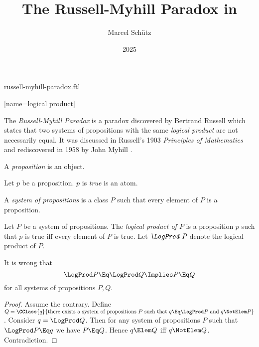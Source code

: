 \documentclass{stex}
\title{The Russell-Myhill Paradox in \Naproche}
\author{Marcel Schütz}
\date{2025}
\begin{document}
\begin{smodule}{russell-myhill-paradox.ftl}


[name=logical product]{\mathop{\sqcap}}

\maketitle

\noindent The \emph{Russell-Myhill Paradox} is a paradox discovered by 
Bertrand Russell which states that two systems of propositions with the same 
\emph{logical product} are not necessarily equal.
It was discussed in Russell's 1903 \emph{Principles of Mathematics}
\cite[Appendix B]{Russell1903} and rediscovered in 1958 by John Myhill
\cite{Myhill1958}.

\begin{forthel}
  \begin{signature*}[for=proposition]
    A \emph{proposition} is an object.
  \end{signature*}

  \begin{signature*}[for=true]
    Let $p$ be a proposition.
    $p$ is \emph{true} is an atom.
  \end{signature*}

  \begin{definition*}[for=system of propositions]
    A \emph{system of propositions} is a class $P$ such that every element of $P$ is a proposition.
  \end{definition*}

  \begin{signature*}[for=logical product]
    Let $P$ be a system of propositions.
    The \emph{logical product of $P$} is a proposition $p$ such that $p$ is true iff every element of $P$ is true.
    Let $\emph{\LogProd P}$ denote the logical product of $P$.
  \end{signature*}
  
  \begin{theorem*}[title=Russell-Myhill Paradox,name=Russell-Myhill Paradox]
    It is wrong that
    \[ \LogProd P \Eq \LogProd Q \Implies P \Eq Q \]
    for all systems of propositions $P, Q$.
  \end{theorem*}
  \begin{proof}
    Assume the contrary.
    Define $Q = \CClass{q}{\text{there exists a system of propositions } P \text{ such that } q \Eq \LogProd P \text{ and } q \NotElem P}$.
    Consider $q = \LogProd Q$.
    Then for any system of propositions $P$ such that $\LogProd P \Eq q$ we have $P \Eq Q$.
    Hence $q \Elem Q$ iff $q \NotElem Q$.
    Contradiction.
  \end{proof}
\end{forthel}

\printbibliography
{}
\end{smodule}
\end{document}
